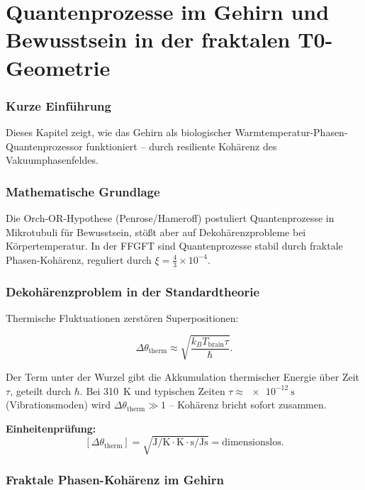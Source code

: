 \chapter{Quantenprozesse im Gehirn und Bewusstsein in der fraktalen T0-Geometrie}


	
	\subsection*{Kurze Einführung}
	
	Dieses Kapitel zeigt, wie das Gehirn als biologischer Warmtemperatur-Phasen-Quantenprozessor funktioniert – durch resiliente Kohärenz des Vakuumphasenfeldes.
	
	\subsection*{Mathematische Grundlage}
	
	Die Orch-OR-Hypothese (Penrose/Hameroff) postuliert Quantenprozesse in Mikrotubuli für Bewusstsein, stößt aber auf Dekohärenzprobleme bei Körpertemperatur. In der FFGFT sind Quantenprozesse stabil durch fraktale Phasen-Kohärenz, reguliert durch \(\xi = \frac{4}{3} \times 10^{-4}\).
	
	\subsection*{Dekohärenzproblem in der Standardtheorie}
	
	Thermische Fluktuationen zerstören Superpositionen:
	
	\begin{equation}
		\Delta \theta_{\text{therm}} \approx \sqrt{\frac{k_B T_{\text{brain}} \tau}{ \hbar }}.
	\end{equation}
	
	Der Term unter der Wurzel gibt die Akkumulation thermischer Energie über Zeit \(\tau\), geteilt durch \(\hbar\). Bei \SI{310}{\kelvin} und typischen Zeiten \(\tau \approx \SI{e-12}{\second}\) (Vibrationsmoden) wird \(\Delta \theta_{\text{therm}} \gg 1\) – Kohärenz bricht sofort zusammen.
	
	\textbf{Einheitenprüfung:}
	\[
	[\Delta \theta_{\text{therm}}] = \sqrt{\si{\joule\per\kelvin} \cdot \si{\kelvin} \cdot \si{\second} / \si{\joule\second}} = \text{dimensionslos}.
	\]
	
	\subsection*{Fraktale Phasen-Kohärenz im Gehirn}
	
